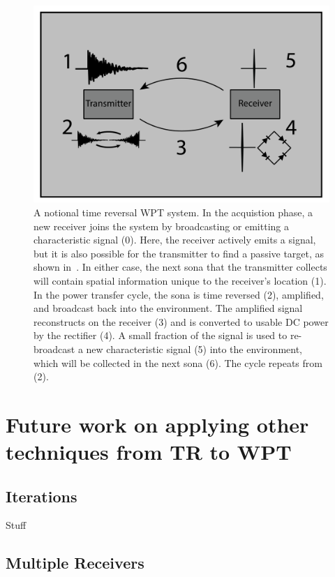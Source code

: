 \begin{figure}[t]
\includegraphics[width=\columnwidth]{figs/future/WPTSys}
\caption{A notional time reversal WPT system. In the acquistion phase, a new receiver joins the system by broadcasting or emitting a characteristic signal (0). Here, the receiver actively emits a signal, but it is also possible for the transmitter to find a passive target, as shown in~\cite{nltr-wave-chaotic}. In either case, the next sona that the transmitter collects will contain spatial information unique to the receiver's location (1). In the power transfer cycle, the sona is time reversed (2), amplified, and broadcast back into the environment. The amplified signal reconstructs on the receiver (3) and is converted to usable DC power by the rectifier (4). A small fraction of the signal is used to re-broadcast a new characteristic signal (5) into the environment, which will be collected in the next sona (6). The cycle repeats from (2).}
\label{fig:SysImage}
\end{figure}



\section{Future work on applying other techniques from TR to WPT}
\label{sec:future-tr}

\subsection{Iterations}

Stuff

\subsection{Multiple Receivers}


